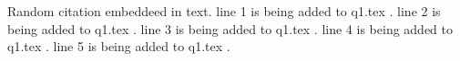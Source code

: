 \documentclass{article}
\begin{document}
Random citation \cite{DUMMY:1} embeddeed in text.
line 1 is being added to q1.tex .\linebreak
line 2 is being added to q1.tex .\linebreak
line 3 is being added to q1.tex .\linebreak
line 4 is being added to q1.tex .\linebreak
line 5 is being added to q1.tex .

\newpage

 

\end{document}
